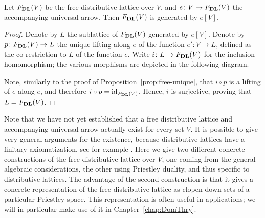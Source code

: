  \begin{proposition}\label{prop:free-generated}
  Let $F_{\mathbf{DL}}(V)$ be the free distributive lattice over $V$, and $e \colon V \to F_{\mathbf{DL}}(V)$ the accompanying universal arrow. Then $F_{\mathbf{DL}}(V)$ is generated by $e[V]$.
  \end{proposition}
  \begin{proof}
  Denote by $L$ the sublattice of $F_{\mathbf{DL}}(V)$ generated by $e[V]$. Denote by $p \colon F_{\mathbf{DL}}(V) \to L$ the unique lifting along $e$ of the function $e' \colon V \to L$, defined as the co-restriction to $L$ of the function $e$. Write $i \colon L \to F_{\mathbf{DL}}(V)$ for the inclusion homomorphism; the various morphisms are depicted in the following diagram. 
  \begin{center}
    \end{center}
  Note, similarly to the proof of Proposition~\ref{prop:free-unique}, that $i \circ p$ is a lifting of $e$ along $e$, and therefore $i \circ p = \mathrm{id}_{F_{\mathbf{DL}}(V)}$. Hence, $i$ is surjective, proving that $L = F_{\mathbf{DL}}(V)$.
  \end{proof}

  
  Note that we have not yet established that a free distributive lattice and accompanying universal arrow actually exist for every set $V$. It is possible to give very general arguments for the existence, because distributive lattices have a finitary axiomatization, see for example \cite[Sec.~II.10]{BurSan2000}. Here we give two different concrete constructions of the free distributive lattice over $V$, one coming from the general algebraic considerations, the other using Priestley duality, and thus specific to distributive lattices. The advantage of the second construction is that it gives a concrete representation of the free distributive lattice as clopen down-sets of a particular Priestley space. This representation is often useful in applications; we will in particular make use of it in Chapter~\ref{chap:DomThry}.\\
  

